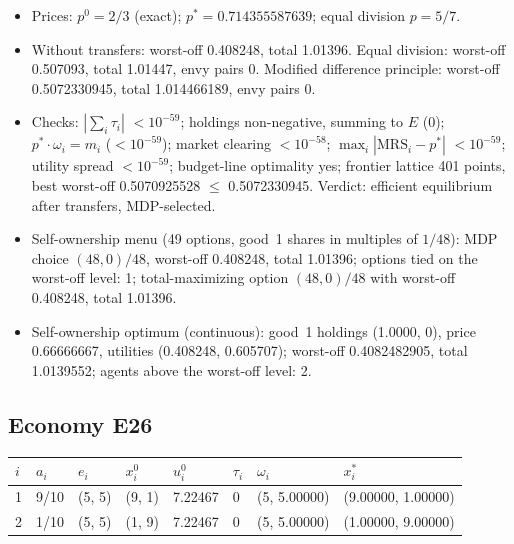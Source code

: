 \begin{itemize}[leftmargin=1.2em,itemsep=0pt,topsep=2pt]\footnotesize
\item Prices: $p^0 = 2/3$ (exact); $p^* = 0.714355587639$; equal division $p = 5/7$.
\item Without transfers: worst-off 0.408248, total 1.01396. Equal division: worst-off 0.507093, total 1.01447, envy pairs 0. Modified difference principle: worst-off 0.5072330945, total 1.014466189, envy pairs 0.
\item Checks: $|\sum_i\tau_i|$ $<10^{-59}$; holdings non-negative, summing to $E$ (0); $p^*\cdot\omega_i = m_i$ ($<10^{-59}$); market clearing $<10^{-58}$; $\max_i|\mathrm{MRS}_i - p^*|$ $<10^{-59}$; utility spread $<10^{-59}$; budget-line optimality yes; frontier lattice 401 points, best worst-off 0.5070925528 $\leq$ 0.5072330945. Verdict: efficient equilibrium after transfers, MDP-selected.
\item Self-ownership menu (49 options, good~1 shares in multiples of $1/48$): MDP choice $(48, 0)/48$, worst-off 0.408248, total 1.01396; options tied on the worst-off level: 1; total-maximizing option $(48, 0)/48$ with worst-off 0.408248, total 1.01396.
\item Self-ownership optimum (continuous): good~1 holdings (1.0000, 0), price 0.66666667, utilities (0.408248, 0.605707); worst-off 0.4082482905, total 1.0139552; agents above the worst-off level: 2.
\end{itemize}

\subsection*{Economy E26}
\label{ec:E26}
{\scriptsize\setlength{\tabcolsep}{3pt}
\begin{tabular}{@{}llllllll@{}}
\toprule
$i$ & $a_i$ & $e_i$ & $x^0_i$ & $u^0_i$ & $\tau_i$ & $\omega_i$ & $x^*_i$ \\
\midrule
1 & 9/10 & (5, 5) & (9, 1) & 7.22467 & 0 & (5, 5.00000) & (9.00000, 1.00000) \\
2 & 1/10 & (5, 5) & (1, 9) & 7.22467 & 0 & (5, 5.00000) & (1.00000, 9.00000) \\
\bottomrule\end{tabular}}

